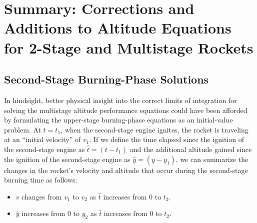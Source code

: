 \chapter{Summary: Corrections and Additions to Altitude Equations for 2-Stage and Multistage Rockets}
\label{supp:ch4-summary}

\noindent{}

\section*{Second-Stage Burning-Phase Solutions}\label{supp:ch4-summary:burning}

In hindsight, better physical insight into the correct limits of integration for solving the multistage
altitude performance equations could have been afforded by formulating the upper-stage burning-phase
equations as an initial-value problem. At $t = t_1$, when the second-stage engine ignites, the rocket is
traveling at an ``initial velocity'' of $v_1$. If we define the time elapsed since the ignition of the
second-stage engine as $\hat{t} = (t - t_1)$ and the additional altitude gained since the ignition of the
second-stage engine as $\hat{y} = (y - y_1)$, we can summarize the changes in the rocket's velocity and
altitude that occur during the second-stage burning time as follows:
\begin{itemize}
  \item $v$ changes from $v_1$ to $v_2$ as $\hat{t}$ increases from 0 to $t_2$.
  \item $\hat{y}$ increases from 0 to $y_2$ as $\hat{t}$ increases from 0 to $t_2$.
\end{itemize}

